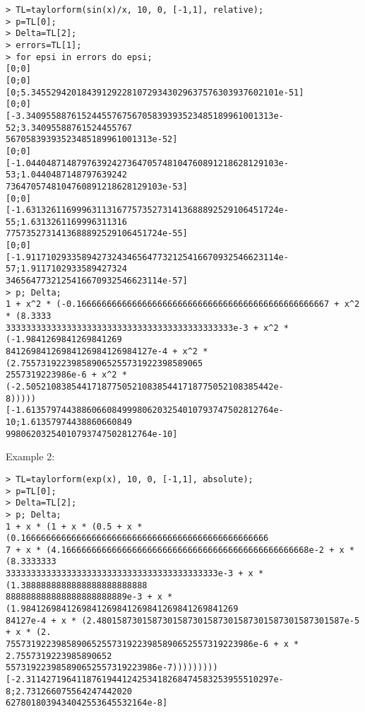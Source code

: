 \begin{center}\begin{minipage}{15cm}\begin{Verbatim}[frame=single]
> TL=taylorform(sin(x)/x, 10, 0, [-1,1], relative);
> p=TL[0];
> Delta=TL[2];
> errors=TL[1];
> for epsi in errors do epsi;
[0;0]
[0;0]
[0;5.3455294201843912922810729343029637576303937602101e-51]
[0;0]
[-3.3409558876152445576756705839393523485189961001313e-52;3.34095588761524455767
56705839393523485189961001313e-52]
[0;0]
[-1.04404871487976392427364705748104760891218628129103e-53;1.0440487148797639242
7364705748104760891218628129103e-53]
[0;0]
[-1.63132611699963113167757352731413688892529106451724e-55;1.6313261169996311316
7757352731413688892529106451724e-55]
[0;0]
[-1.91171029335894273243465647732125416670932546623114e-57;1.9117102933589427324
3465647732125416670932546623114e-57]
> p; Delta;
1 + x^2 * (-0.16666666666666666666666666666666666666666666666667 + x^2 * (8.3333
333333333333333333333333333333333333333333333e-3 + x^2 * (-1.9841269841269841269
84126984126984126984126984127e-4 + x^2 * (2.755731922398589065255731922398589065
2557319223986e-6 + x^2 * (-2.5052108385441718775052108385441718775052108385442e-
8)))))
[-1.6135797443886066084999806203254010793747502812764e-10;1.61357974438860660849
99806203254010793747502812764e-10]
\end{Verbatim}
\end{minipage}\end{center}
\noindent Example 2: 
\begin{center}\begin{minipage}{15cm}\begin{Verbatim}[frame=single]
> TL=taylorform(exp(x), 10, 0, [-1,1], absolute);
> p=TL[0];
> Delta=TL[2];
> p; Delta;
1 + x * (1 + x * (0.5 + x * (0.1666666666666666666666666666666666666666666666666
7 + x * (4.1666666666666666666666666666666666666666666666668e-2 + x * (8.3333333
333333333333333333333333333333333333333333e-3 + x * (1.3888888888888888888888888
888888888888888888888889e-3 + x * (1.9841269841269841269841269841269841269841269
84127e-4 + x * (2.4801587301587301587301587301587301587301587301587e-5 + x * (2.
7557319223985890652557319223985890652557319223986e-6 + x * 2.7557319223985890652
557319223985890652557319223986e-7)))))))))
[-2.3114271964118761944124253418268474583253955510297e-8;2.731266075564247442020
6278018039434042553645532164e-8]
\end{Verbatim}
\end{minipage}\end{center}
